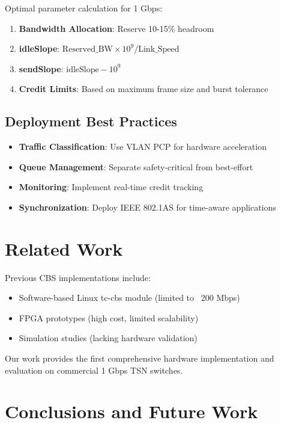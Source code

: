\documentclass[10pt, journal, compsoc]{IEEEtran}
\begin{document}
Optimal parameter calculation for 1 Gbps:

\begin{enumerate}
    \item \textbf{Bandwidth Allocation}: Reserve 10-15\% headroom
    \item \textbf{idleSlope}: $\text{Reserved\_BW} \times 10^9 / \text{Link\_Speed}$
    \item \textbf{sendSlope}: $\text{idleSlope} - 10^9$
    \item \textbf{Credit Limits}: Based on maximum frame size and burst tolerance
\end{enumerate}

\subsection{Deployment Best Practices}

\begin{itemize}
    \item \textbf{Traffic Classification}: Use VLAN PCP for hardware acceleration
    \item \textbf{Queue Management}: Separate safety-critical from best-effort
    \item \textbf{Monitoring}: Implement real-time credit tracking
    \item \textbf{Synchronization}: Deploy IEEE 802.1AS for time-aware applications
\end{itemize}

\section{Related Work}

Previous CBS implementations include:
\begin{itemize}
    \item Software-based Linux tc-cbs module (limited to ~200 Mbps)
    \item FPGA prototypes (high cost, limited scalability)
    \item Simulation studies (lacking hardware validation)
\end{itemize}

Our work provides the first comprehensive hardware implementation and evaluation on commercial 1 Gbps TSN switches.

\section{Conclusions and Future Work}
\end{document}

